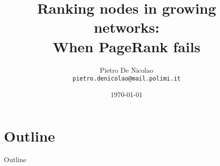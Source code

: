 \documentclass[utf8]{beamer}
\title[When PageRank fails]{Ranking nodes in growing networks: \\ When PageRank fails}
\author[De Nicolao]{Pietro De Nicolao \\ \texttt{pietro.denicolao@mail.polimi.it}}
\date{\today} %
\institute{Politecnico di Milano}
\begin{document}
\begin{frame}
    \titlepage
\end{frame}

\section*{Outline}
\begin{frame}{Outline}
    \tableofcontents
\end{frame}






\end{document}
